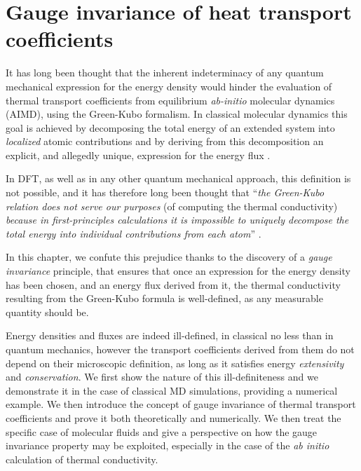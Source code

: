 \chapter{Gauge invariance of heat transport coefficients} \label{ch:gauge-invariance}

\begin{LEtext}
It has long been thought that the inherent indeterminacy of any quantum mechanical expression for the energy density would hinder the evaluation of thermal transport coefficients from equilibrium \emph{ab-initio} molecular dynamics (AIMD), using the Green-Kubo formalism.  
In classical molecular dynamics this goal is achieved by decomposing the total energy of an extended system into \emph{localized} atomic contributions and by deriving from this decomposition an explicit, and allegedly unique, expression for the energy flux \cite{Irving1950}.

In DFT, as well as in any other quantum mechanical approach, this definition is not possible, and it has therefore long been thought that ``\emph{the Green-Kubo relation does not serve our purposes} (of computing the thermal conductivity) \emph{because in first-principles calculations it is impossible to uniquely decompose the total energy into individual contributions from each atom}'' \cite{Stackhouse2010b}. 

In this chapter, we confute this prejudice thanks to the discovery of a \emph{gauge invariance} principle, that ensures that once an expression for the energy density has been chosen, and an energy flux derived from it, the thermal conductivity resulting from the Green-Kubo formula is well-defined, as any measurable quantity should be. 

Energy densities and fluxes are indeed ill-defined, in classical no less than in quantum mechanics, however the transport coefficients derived from them do not depend on their microscopic definition, as long as it satisfies energy \emph{extensivity} and \emph{conservation}. 
We first show the nature of this ill-definiteness and we demonstrate it in the case of classical MD simulations, providing a numerical example. We then introduce the concept of gauge invariance of thermal transport coefficients and prove it both theoretically and numerically.
We then treat the specific case of molecular fluids and give a perspective on how the gauge invariance property may be exploited, especially in the case of the \emph{ab initio} calculation of thermal conductivity.
\end{LEtext}


